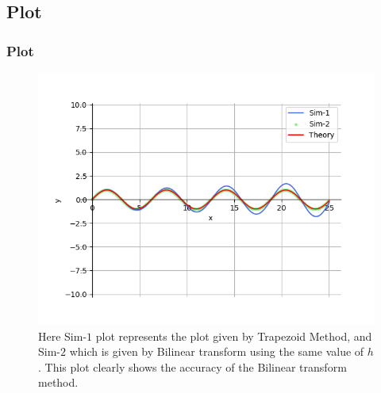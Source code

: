 \documentclass{beamer}
\theoremstyle{remark}
\numberwithin{equation}{section}
\begin{document}
\subsection{Plot}
\begin{frame}
\frametitle{Plot}
\begin{figure}[h!]
   \centering
   \includegraphics[width=0.7\linewidth]{figs/graph.png}
   \caption{Here Sim-$1$ plot represents the plot given by Trapezoid Method, and Sim-$2$ which is given by Bilinear transform using the same value of $h$. This plot clearly shows the accuracy of the Bilinear transform method.}
\end{figure}
\end{frame}
\end{document}
